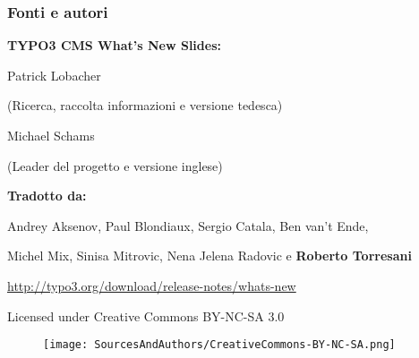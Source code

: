 \begin{frame}[fragile]
	\frametitle{Fonti e autori}

	\vspace{-0.6cm}

	\centerline{\textbf{TYPO3 CMS What's New Slides:}}

	\begin{center}
		\smaller
			\centerline{Patrick Lobacher}
			\centerline{(Ricerca, raccolta informazioni e versione tedesca)}
			\vspace{0.1cm}
			\centerline{Michael Schams}
			\centerline{(Leader del progetto e versione inglese)}
		\normalsize
	\end{center}
	\vspace{-0.6cm}
	\begin{center}
		\smaller
			\centerline{\textbf{Tradotto da:}}
			\centerline{Andrey Aksenov, Paul Blondiaux, Sergio Catala, Ben van't Ende,}
			\centerline{Michel Mix, Sinisa Mitrovic, Nena Jelena Radovic e \textbf{Roberto Torresani}}
		\normalsize
	\end{center}
	\vspace{-0.6cm}
	\smaller\begin{center}\url{http://typo3.org/download/release-notes/whats-new}\end{center}\normalsize

	\smaller\begin{center}Licensed under Creative Commons BY-NC-SA 3.0\end{center}\normalsize
	\begin{figure}\vspace*{-0.3cm}
		\texttt{[image: SourcesAndAuthors/CreativeCommons-BY-NC-SA.png]}
	\end{figure}

\end{frame}


